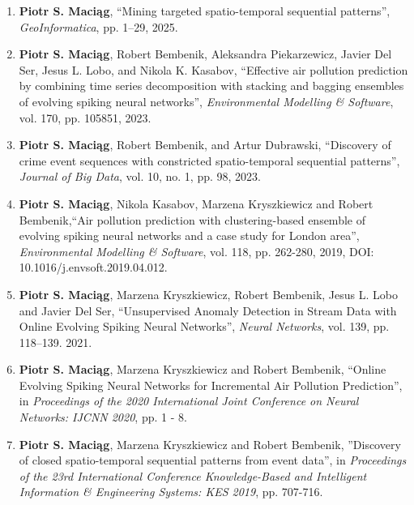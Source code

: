 \documentclass[10pt,a4paper,sans]{moderncv}        %
\begin{document}
\begin{enumerate}

    \item \textbf{Piotr S. Maci{\k{a}}g}, ``Mining targeted spatio-temporal sequential patterns'', \textit{GeoInformatica}, pp. 1–29, 2025.

    \item \textbf{Piotr S. Maci\k{a}g}, Robert Bembenik, Aleksandra Piekarzewicz, Javier Del Ser, Jesus L. Lobo, and Nikola K. Kasabov,
    ``Effective air pollution prediction by combining time series decomposition with stacking and bagging ensembles of evolving spiking neural networks'',
    \textit{Environmental Modelling \& Software}, vol. 170, pp. 105851, 2023.

    \item \textbf{Piotr S. Maci\k{a}g}, Robert Bembenik, and Artur Dubrawski,
    ``Discovery of crime event sequences with constricted spatio-temporal sequential patterns'', \textit{Journal of Big Data}, vol. 10, no. 1, pp. 98, 2023.
    
    \item \textbf{Piotr S. Maci\k{a}g}, Nikola Kasabov, Marzena Kryszkiewicz and Robert Bembenik,``Air pollution prediction with clustering-based ensemble of evolving spiking neural networks and a case study for London area'', \textit{Environmental Modelling \& Software}, vol. 118, pp. 262-280, 2019, DOI: 10.1016/j.envsoft.2019.04.012.

    \item \textbf{Piotr S. Maci\k{a}g}, Marzena Kryszkiewicz, Robert Bembenik, Jesus L. Lobo and Javier Del Ser, ``Unsupervised Anomaly Detection in Stream Data with Online Evolving Spiking Neural Networks'', \textit{Neural Networks}, vol. 139, pp. 118–139. 2021.
    
    \item \textbf{Piotr S. Maci\k{a}g}, Marzena Kryszkiewicz and Robert Bembenik, ``Online Evolving Spiking Neural Networks for Incremental Air Pollution Prediction'', in \textit{Proceedings of the 2020 International Joint Conference on Neural Networks: IJCNN 2020}, pp. 1 - 8.
    
    \item\textbf{Piotr S. Maci\k{a}g}, Marzena Kryszkiewicz and Robert Bembenik, ''Discovery of closed spatio-temporal sequential patterns from event data'', in \textit{Proceedings of the 23rd International Conference Knowledge-Based and Intelligent Information {\&} Engineering Systems: KES 2019}, pp. 707-716.
    

\end{enumerate}
\end{document}
